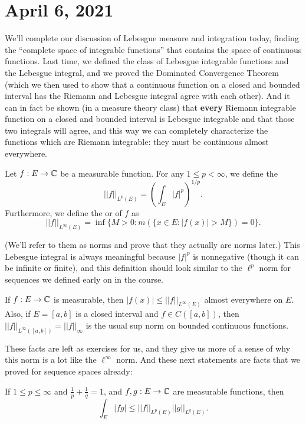 \pagebreak\section*{April 6, 2021}

We'll complete our discussion of Lebesgue measure and integration today, finding the ``complete space of integrable functions'' that contains the space of continuous functions. Last time, we defined the class of Lebesgue integrable functions and the Lebesgue integral, and we proved the Dominated Convergence Theorem (which we then used to show that a continuous function on a closed and bounded interval has the Riemann and Lebesgue integral agree with each other). And it can in fact be shown (in a measure theory class) that \textbf{every} Riemann integrable function on a closed and bounded interval is Lebesgue integrable and that those two integrals will agree, and this way we can completely characterize the functions which are Riemann integrable: they must be continuous almost everywhere. 

\begin{definition}
Let $f: E \to \mathbb C$ be a measurable function. For any $1 \le p < \infty$, we define the 
\[
    ||f||_{L^p(E)} = \left(\int_E |f|^p\right)^{1/p}.
\]
Furthermore, we define the  or  of $f$ as
\[
    ||f||_{L^\infty(E)} = \inf\{M > 0: m(\{x \in E: |f(x)| > M \}) = 0\}.
\]
\end{definition}

(We'll refer to them as norms and prove that they actually are norms later.) This Lebesgue integral is always meaningful because $|f|^p$ is nonnegative (though it can be infinite or finite), and this definition should look similar to the $\ell^p$ norm for sequences we defined early on in the course.

\begin{proposition}
If $f: E \to \mathbb C$ is measurable, then $|f(x)| \le ||f||_{L^{\infty}(E)}$ almost everywhere on $E$. Also, if $E = [a, b]$ is a closed interval and $f \in C([a, b])$, then $||f||_{L^\infty([a, b])} = ||f||_{\infty}$ is the usual sup norm on bounded continuous functions.
\end{proposition}

These facts are left as exercises for us, and they give us more of a sense of why this norm is a lot like the $\ell^{\infty}$ norm. And these next statements are facts that we proved for sequence spaces already:

\begin{theorem}
If $1 \le p \le \infty$ and $\frac{1}{p} + \frac{1}{q} = 1$, and $f, g: E \to \mathbb C$ are measurable functions, then
\[
    \int_E |fg| \le ||f||_{L^p(E)} ||g||_{L^q(E)}.
\]
\end{theorem} 

